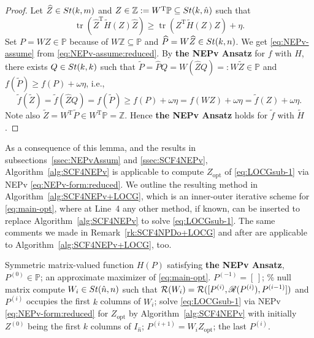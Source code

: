 \documentclass[11pt]{article}
\def\bbP{\mathbb{P}}
\def\bbZ{\mathbb{Z}}
\def\scrR{\mathscr{R}}
\def\cR{{\cal R}}
\def\wtd{\widetilde}
\def\what{\widehat}
\newcommand\STM[2]{{\rm St}(#1,#2)}
\DeclareMathOperator*{\opt}{opt}
\DeclareMathOperator{\tr}{tr}
\DeclareMathOperator{\T}{T}
\def\scrR{\mathscr{R}}
\theoremstyle{definition}
\numberwithin{equation}{section}
\begin{document}
\begin{proof}
Let $\what Z\in\STM{k}{m}$ and $Z\in\bbZ:=W^{\T}\bbP\subseteq\STM{k}{\hat n}$ such that
\begin{equation}\label{eq:NEPv-assume:reduced}
\tr(\what Z^{\T}\wtd H(Z)\what Z)\ge\tr(Z^{\T}\wtd H(Z)Z)+\eta.
\end{equation}
Set $P=WZ\in\bbP$ because of $W\bbZ\subseteq\bbP$ and $\what P=W\what Z\in\STM{k}{n}$. We get
\eqref{eq:NEPv-assume} from \eqref{eq:NEPv-assume:reduced}. By {\bf the NEPv Ansatz} for $f$ with $H$,
there exists $Q\in\STM{k}{k}$ such that
$\wtd P=\what PQ=W(\what ZQ)=:W\wtd Z\in\bbP$ and
$f(\wtd P)\ge f(P)+\omega\eta$, i.e.,
$$
\wtd f(\wtd Z)=\wtd f(\what ZQ)=f(\wtd P)\ge f(P)+\omega\eta
  =f(WZ)+\omega\eta
  =\wtd f(Z)+\omega\eta.
$$
Note also $\wtd Z=W^{\T}\wtd P\in W^{\T}\bbP=\bbZ$. Hence {\bf the NEPv Ansatz} holds for $\wtd f$ with $\wtd H$.
\end{proof}

As a consequence of this lemma, and the results in subsections~\ref{ssec:NEPvAssum} and \ref{ssec:SCF4NEPv}, Algorithm~\ref{alg:SCF4NEPv}
is applicable to compute $Z_{\opt}$ of \eqref{eq:LOCGsub-1} via NEPv \eqref{eq:NEPv-form:reduced}.
We outline the resulting
method in Algorithm~\ref{alg:SCF4NEPv+LOCG}, which is an inner-outer iterative scheme for \eqref{eq:main-opt},
where at Line~4
any other method, if known, can be inserted to replace Algorithm~\ref{alg:SCF4NEPv} to
solve \eqref{eq:LOCGsub-1}. The same comments we made in Remark~\ref{rk:SCF4NPDo+LOCG} and after are applicable to
Algorithm~\ref{alg:SCF4NEPv+LOCG}, too.

\begin{algorithm}[t]
\caption{NEPvLOCG: NEPv \eqref{eq:NEPv-form} solved by LOCG} \label{alg:SCF4NEPv+LOCG}
\begin{algorithmic}[1]\REQUIRE Symmetric matrix-valued function $H(P)$ satisfying {\bf the NEPv Ansatz}, $P^{(0)}\in\bbP$;
\ENSURE  an approximate maximizer of \eqref{eq:main-opt}.
\STATE $P^{(-1)}=[\,]$; \% null matrix
    \STATE compute $W_i\in\STM{\hat n}{n}$ such that $\cR(W_i)=\cR([P^{(i)},\scrR(P^{(i)}),P^{(i-1)}])$
           and $P^{(i)}$ occupies
           the first $k$ columns of $W_i$;
    \STATE solve \eqref{eq:LOCGsub-1} via NEPv \eqref{eq:NEPv-form:reduced} for $Z_{\opt}$ by  Algorithm~\ref{alg:SCF4NEPv}
           with initially $Z^{(0)}$ being the first $k$ columns of $I_{\hat n}$;
    \STATE $P^{(i+1)}=W_iZ_{\opt}$;
\ENDFOR
\RETURN the last $P^{(i)}$.
\end{algorithmic}
\end{algorithm}
\end{document}
